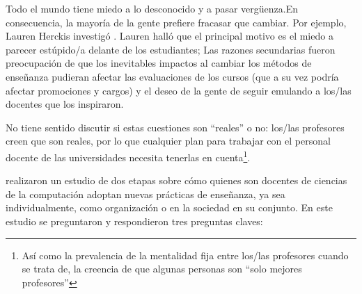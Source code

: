 
Todo el mundo tiene miedo a lo desconocido y a pasar vergüenza.En consecuencia,
la mayoría de la gente prefiere fracasar que cambiar.
Por ejemplo,
Lauren Herckis investigó 
.
Lauren halló que el principal motivo es el miedo a parecer estúpido/a delante de  los estudiantes; 
Las razones secundarias fueron
preocupación de que los inevitables impactos al cambiar los métodos de enseñanza pudieran afectar las evaluaciones de los cursos (que  a su vez podría afectar promociones y cargos) 
y el deseo de la gente de seguir emulando a los/las docentes que los inspiraron. 

No tiene sentido discutir si estas cuestiones son ``reales'' o no:
los/las profesores creen que son reales,
por lo que cualquier plan para trabajar con el personal docente de las universidades necesita tenerlas en cuenta\footnote{
Así como la prevalencia de la mentalidad fija entre los/las profesores cuando se trata de, la creencia de que algunas personas son ``solo mejores profesores'' }.

\cite{Bark2015} realizaron un estudio de dos etapas sobre cómo quienes son docentes de ciencias de la computación adoptan nuevas prácticas de enseñanza, ya sea individualmente, como organización o en la sociedad en su conjunto. En este estudio se preguntaron y respondieron tres preguntas claves:

